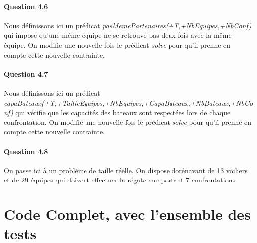 \documentclass[11pt]{article} %
\begin{document}
\paragraph{Question 4.6}
Nous définissons ici un prédicat \textit{pasMemePartenaires(+T,+NbEquipes,+NbConf)} qui impose qu'une même équipe ne se retrouve pas deux fois avec la même équipe. On modifie une nouvelle fois le prédicat  \textit{solve} pour qu'il prenne en compte cette nouvelle contrainte.


\paragraph{Question 4.7}
Nous définissons ici un prédicat \textit{capaBateaux(+T,+TailleEquipes,+NbEquipes,+CapaBateaux,+NbBateaux,+NbConf)} qui vérifie que les capacités des bateaux sont respectées lors de chaque confrontation. On modifie une nouvelle fois le prédicat  \textit{solve} pour qu'il prenne en compte cette nouvelle contrainte.


\paragraph{Question 4.8}
On passe ici à un problème de taille réelle. On dispose dorénavant de 13 voiliers et de 29 équipes qui doivent effectuer la régate comportant 7 confrontations.


\newpage

\section{Code Complet, avec l'ensemble des tests}

\end{document}
